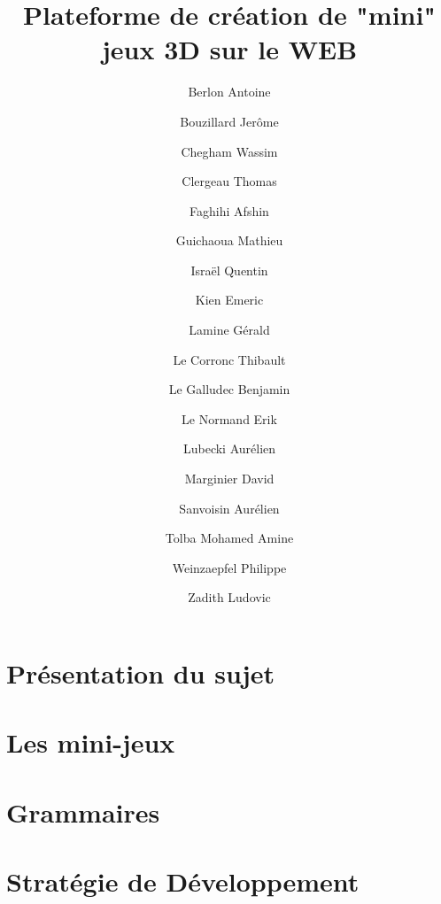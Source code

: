 \documentclass[a4paper,10pt]{article}
\title{Plateforme de création de "mini" jeux 3D sur le WEB}
\author{Berlon Antoine \and
Bouzillard Jerôme \and
Chegham	Wassim \and
Clergeau Thomas \and
Faghihi	Afshin \and
Guichaoua Mathieu \and
Israël Quentin \and
Kien Emeric \and
Lamine Gérald \and
Le Corronc Thibault \and
Le Galludec Benjamin \and
Le Normand Erik \and
Lubecki Aurélien \and
Marginier David \and
Sanvoisin Aurélien \and
Tolba Mohamed Amine \and
Weinzaepfel Philippe \and
Zadith	Ludovic}
\date{}
\begin{document}
 
\maketitle

\section{Présentation du sujet}
\label{sec:sujet}
 

\section{Les mini-jeux}
\label{sec:minijeux}


\section{Grammaires}
\label{sec:grammaire}


\section{Stratégie de Développement}
\label{sec:strategie}

\end{document}
